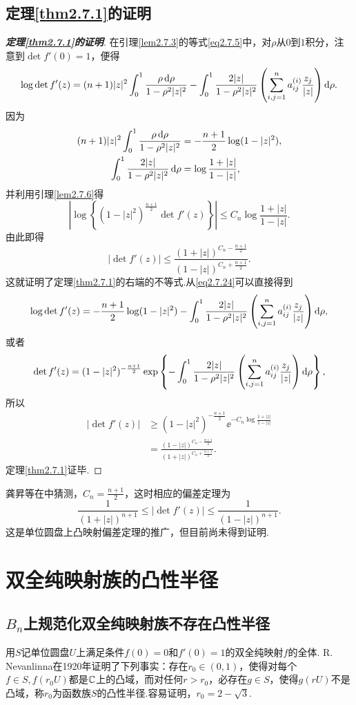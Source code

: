 \subsection{定理\ref{thm2.7.1}的证明}
\begin{proof}[\textbf{定理\ref{thm2.7.1}的证明}]
	在引理\ref{lem2.7.3}的等式\eqref{eq2.7.5}中，对$\rho$从$0$到$1$积分，注意到$\det f'(0)=1$，便得
	\begin{equation}\label{eq2.7.24}
		\log\det f'(z)=(n+1)|z|^2\int_{0}^{1}\frac{\rho\mathop{}\!\mathrm{d}\rho}{1-\rho^2|z|^2}-\int_{0}^{1}\frac{2|z|}{1-\rho^2|z|^2}\left(\sum_{i,j=1}^{n}a_{ij}^{(i)}\frac{z_j}{|z|}\right)\mathop{}\!\mathrm{d}\rho.
	\end{equation}
因为
\begin{align*}
	(n+1)|z|^2\int_{0}^{1}\frac{\rho\mathop{}\!\mathrm{d}\rho}{1-\rho^2|z|^2}
	&=-\frac{n+1}{2}\log(1-|z|^2),\\
	\int_{0}^{1}\frac{2|z|}{1-\rho^2|z|^2}\mathop{}\!\mathrm{d}\rho
	&=\log\frac{1+|z|}{1-|z|},
\end{align*}
并利用引理\ref{lem2.7.6}得
\[\left|\log\left\{(1-|z|^2)^{\frac{n+1}{2}}\det f'(z)\right\}\right|\le C_n\log\frac{1+|z|}{1-|z|}.\]
由此即得
\[|\det f'(z)|\le\frac{(1+|z|)^{C_n-\frac{n+1}{2}}}{(1-|z|)^{C_n+\frac{n+1}{2}}}.\]
这就证明了定理\ref{thm2.7.1}的右端的不等式.从\eqref{eq2.7.24}可以直接得到
\[\log\det f'(z)=-\frac{n+1}{2}\log(1-|z|^2)-\int_{0}^{1}\frac{2|z|}{1-\rho^2|z|^2}\left(\sum_{i,j=1}^{n}a_{ij}^{(i)}\frac{z_j}{|z|}\right)\mathop{}\!\mathrm{d}\rho,\]
或者
\[\det f'(z)=(1-|z|^2)^{-\frac{n+1}{2}}\exp\left\{-\int_{0}^{1}\frac{2|z|}{1-\rho^2|z|^2}\left(\sum_{i,j=1}^{n}a_{ij}^{(i)}\frac{z_j}{|z|}\right)\mathop{}\!\mathrm{d}\rho\right\},\]
所以
\begin{align*}
	|\det f'(z)|
	&\ge (1-|z|^2)^{-\frac{n+1}{2}}\ee^{-C_n\log\frac{1+|z|}{1-|z|}}\\
	&=\frac{(1-|z|)^{C_n-\frac{n+1}{2}}}{(1+|z|)^{C_n+\frac{n+1}{2}}}.
\end{align*}
定理\ref{thm2.7.1}证毕.
\end{proof}
龚{昇}等在\cite{barnard1994distortion}中猜测，$C_n=\frac{n+1}{2}$，这时相应的偏差定理为
\[\frac1{(1+|z|)^{n+1}}\le|\det f'(z)|\le\frac1{(1-|z|)^{n+1}}.\]
这是单位圆盘上凸映射偏差定理的推广，但目前尚未得到证明.
\section{双全纯映射族的凸性半径\label{sec2.8}}
\subsection{$B_n$上规范化双全纯映射族不存在凸性半径}
用$S$记单位圆盘$U$上满足条件$f(0)=0$和$f'(0)=1$的双全纯映射$f$的全体. R. Nevanlinna在1920年证明了下列事实：存在$r_0\in(0,1)$，使得对每个$f\in S,f(r_0 U)$都是$\mathbb C$上的凸域，而对任何$r>r_0$，必存在$g\in S$，使得$g(rU)$不是凸域，称$r_0$为函数族$S$的凸性半径.容易证明\cite{戈卢津1956复变函数的几何理论}，$r_0=2-\sqrt{3}$.

